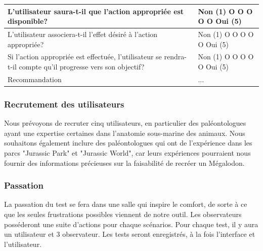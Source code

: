 \documentclass{article}
\begin{document}
\begin{table}[h]
\begin{tabular}{|p{6cm}|p{1.5cm}|p{1.5cm}|p{2.5cm}|p{3.5cm}|}
		\multicolumn{2}{|p{7.5cm}|}{L’utilisateur saura-t-il que l’action appropriée est disponible?}                                             & \multicolumn{3}{p{7.5cm}|}{Non (1) O O O O O Oui (5)}                                                                                       \\ \hline
		\multicolumn{2}{|p{7.5cm}|}{L’utilisateur associera-t-il l’effet désiré à l’action appropriée?}                                           & \multicolumn{3}{p{7.5cm}|}{Non (1) O O O O O Oui (5)}                                                                                       \\ \hline
		\multicolumn{2}{|p{7.5cm}|}{Si l’action appropriée est effectuée, l’utilisateur se rendra-t-il compte qu’il progresse vers son objectif?} & \multicolumn{3}{p{7.5cm}|}{Non (1) O O O O O Oui (5)}                                                                                       \\ \hline
		\multicolumn{2}{|p{7.5cm}|}{Recommandation}                                                                                               & \multicolumn{3}{p{7.5cm}|}{...}                                                                                                             \\ \hline
	\end{tabular}
\end{table}

\clearpage
\subsubsection{Recrutement des utilisateurs}
Nous prévoyons de recruter cinq utilisateurs, en particulier des paléontologues ayant une expertise certaines dans l'anatomie sous-marine des animaux. Nous souhaitons également inclure des paléontologues qui ont de l'expérience dans les parcs "Jurassic Park" et "Jurassic World", car leurs expériences pourraient nous fournir des informations précieuses sur la faisabilité de recréer un Mégalodon.

\subsubsection{Passation}
La passation du test se fera dans une salle qui inspire le comfort, de sorte à ce que les seules frustrations possibles viennent de notre outil. Les observateurs posséderont une suite d'actions pour chaque scénarios. Pour chaque test, il y aura un utilisateur et 3 observateur. Les tests seront enregistrés, à la fois l'interface et l'utilisateur.
\end{document}
